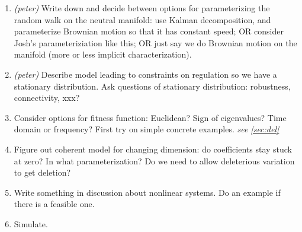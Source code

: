 \documentclass[11 pt]{article}
\newcommand{\jss}[1]{{\color{olive}\it #1}}
\begin{document}
\begin{enumerate}
    \item \emph{(peter)} Write down and decide between options for parameterizing the random walk on the neutral manifold:
        use Kalman decomposition, and parameterize Brownian motion so that it has constant speed;
        OR consider Josh's parameteriziation like this;
        OR just say we do Brownian motion on the manifold (more or less implicit characterization).

    \item \emph{(peter)} Describe model leading to constraints on regulation so we have a stationary distribution.
        Ask questions of stationary distribution: robustness, connectivity, xxx?

    \item Consider options for fitness function: Euclidean? Sign of eigenvalues?  Time domain or frequency?
      First try on simple concrete examples. \jss{see \ref{sec:del}}

    \item Figure out coherent model for changing dimension: do coefficients stay stuck at zero? In what parameterization? 
        Do we need to allow deleterious variation to get deletion?

    \item Write something in discussion about nonlinear systems.  Do an example if there is a feasible one.

    \item Simulate.

\end{enumerate}

% 
% 
% 
% 
% 
% 
%
% 
%
%
%
% 
%
%
% 
\end{document}
